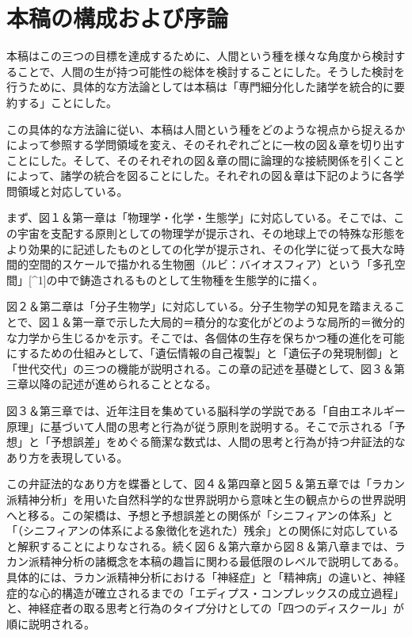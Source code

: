 \documentclass[8pt, a5paper]{ltjsarticle}
\begin{document}
\section{本稿の構成および序論}\label{ux672cux7a3fux306eux69cbux6210ux304aux3088ux3073ux5e8fux8ad6}

本稿はこの三つの目標を達成するために、人間という種を様々な角度から検討することで、人間の生が持つ可能性の総体を検討することにした。そうした検討を行うために、具体的な方法論としては本稿は「専門細分化した諸学を統合的に要約する」ことにした。

この具体的な方法論に従い、本稿は人間という種をどのような視点から捉えるかによって参照する学問領域を変え、そのそれぞれごとに一枚の図＆章を切り出すことにした。そして、そのそれぞれの図＆章の間に論理的な接続関係を引くことによって、諸学の統合を図ることにした。それぞれの図＆章は下記のように各学問領域と対応している。

まず、図１＆第一章は「物理学・化学・生態学」に対応している。そこでは、この宇宙を支配する原則としての物理学が提示され、その地球上での特殊な形態をより効果的に記述したものとしての化学が提示され、その化学に従って長大な時間的空間的スケールで描かれる生物圏（ルビ：バイオスフィア）という「多孔空間」{[}\^{}1{]}の中で鋳造されるものとして生物種を生態学的に描く。

図２＆第二章は「分子生物学」に対応している。分子生物学の知見を踏まえることで、図１＆第一章で示した大局的＝積分的な変化がどのような局所的＝微分的な力学から生じるかを示す。そこでは、各個体の生存を保ちかつ種の進化を可能にするための仕組みとして、「遺伝情報の自己複製」と「遺伝子の発現制御」と「世代交代」の三つの機能が説明される。この章の記述を基礎として、図３＆第三章以降の記述が進められることとなる。

図３＆第三章では、近年注目を集めている脳科学の学説である「自由エネルギー原理」に基づいて人間の思考と行為が従う原則を説明する。そこで示される「予想」と「予想誤差」をめぐる簡潔な数式は、人間の思考と行為が持つ弁証法的なあり方を表現している。

この弁証法的なあり方を蝶番として、図４＆第四章と図５＆第五章では「ラカン派精神分析」を用いた自然科学的な世界説明から意味と生の観点からの世界説明へと移る。この架橋は、予想と予想誤差との関係が「シニフィアンの体系」と「（シニフィアンの体系による象徴化を逃れた）残余」との関係に対応していると解釈することによりなされる。続く図６＆第六章から図８＆第八章までは、ラカン派精神分析の諸概念を本稿の趣旨に関わる最低限のレベルで説明してある。具体的には、ラカン派精神分析における「神経症」と「精神病」の違いと、神経症的な心的構造が確立されるまでの「エディプス・コンプレックスの成立過程」と、神経症者の取る思考と行為のタイプ分けとしての「四つのディスクール」が順に説明される。
\end{document}
